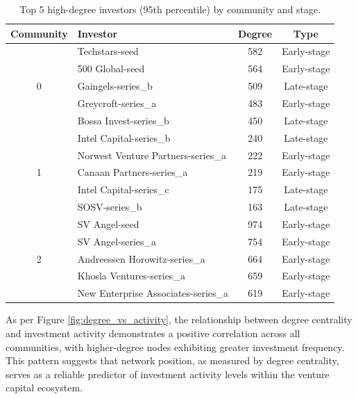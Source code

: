\begin{table}[ht]
\centering
\begin{tabular}{|c|l|c|c|}
\hline
\textbf{Community} & \textbf{Investor} & \textbf{Degree} & \textbf{Type} \\
\hline
\multirow{5}{*}{0} & Techstars-seed & 582 & Early-stage \\
& 500 Global-seed & 564 & Early-stage \\
& Gaingels-series\_b & 509 & Late-stage \\
& Greycroft-series\_a & 483 & Early-stage \\
& Bossa Invest-series\_b & 450 & Late-stage \\
\hline
\multirow{5}{*}{1} & Intel Capital-series\_b & 240 & Late-stage \\
& Norwest Venture Partners-series\_a & 222 & Early-stage \\
& Canaan Partners-series\_a & 219 & Early-stage \\
& Intel Capital-series\_c & 175 & Late-stage \\
& SOSV-series\_b & 163 & Late-stage \\
\hline
\multirow{5}{*}{2} & SV Angel-seed & 974 & Early-stage \\
& SV Angel-series\_a & 754 & Early-stage \\
& Andreessen Horowitz-series\_a & 664 & Early-stage \\
& Khosla Ventures-series\_a & 659 & Early-stage \\
& New Enterprise Associates-series\_a & 619 & Early-stage \\
\hline
\end{tabular}
\caption{Top 5 high-degree investors (95th percentile) by community and stage.}
\label{tab:high_degree_nodes}
\end{table}

As per Figure \ref{fig:degree_vs_activity}, the relationship between degree centrality and investment activity demonstrates a positive correlation across all communities, with higher-degree nodes exhibiting greater investment frequency. This pattern suggests that network position, as measured by degree centrality, serves as a reliable predictor of investment activity levels within the venture capital ecosystem.


